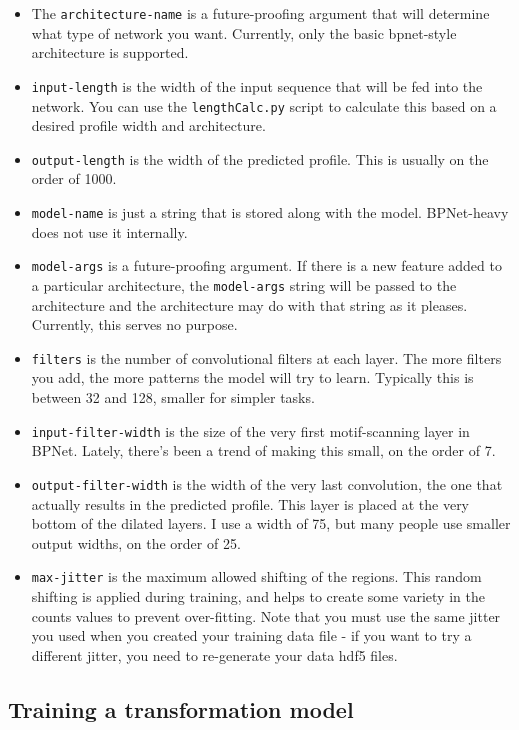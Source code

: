 \documentclass{article}
\begin{document}
\begin{itemize}
    \item The \texttt{architecture-name} is a future-proofing argument that will determine what type of network you want. Currently, only the basic bpnet-style architecture is supported. 
    \item \texttt{input-length} is the width of the input sequence that will be fed into the network. You can use the \texttt{lengthCalc.py} script to calculate this based on a desired profile width and architecture.
    \item \texttt{output-length} is the width of the predicted profile. This is usually on the order of 1000.
    \item \texttt{model-name} is just a string that is stored along with the model. BPNet-heavy does not use it internally.
    \item \texttt{model-args} is a future-proofing argument. If there is a new feature added to a particular architecture, the \texttt{model-args} string will be passed to the architecture and the architecture may do with that string as it pleases. Currently, this serves no purpose. 
    \item \texttt{filters} is the number of convolutional filters at each layer. The more filters you add, the more patterns the model will try to learn. Typically this is between 32 and 128, smaller for simpler tasks. 
    \item \texttt{input-filter-width} is the size of the very first motif-scanning layer in BPNet. Lately, there's been a trend of making this small, on the order of 7. 
    \item \texttt{output-filter-width} is the width of the very last convolution, the one that actually results in the predicted profile. This layer is placed at the very bottom of the dilated layers. I use a width of 75, but many people use smaller output widths, on the order of 25. 
    \item \texttt{max-jitter} is the maximum allowed shifting of the regions. This random shifting is applied during training, and helps to create some variety in the counts values to prevent over-fitting. Note that you must use the same jitter you used when you created your training data file - if you want to try a different jitter, you need to re-generate your data hdf5 files. 
\end{itemize}

\subsection{Training a transformation model}
\end{document}
